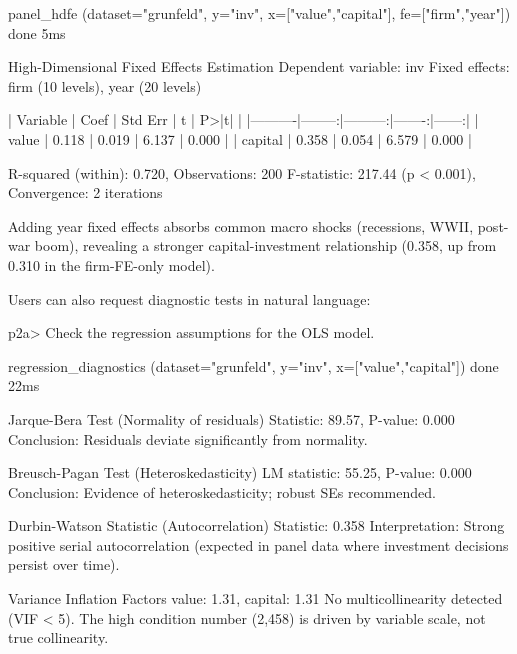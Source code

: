 \begin{Soutput}
  [tool] panel_hdfe (dataset="grunfeld", y="inv",
           x=["value","capital"], fe=["firm","year"])          done 5ms

High-Dimensional Fixed Effects Estimation
Dependent variable: inv
Fixed effects: firm (10 levels), year (20 levels)

| Variable |    Coef |  Std Err |      t | P>|t| |
|----------|--------:|---------:|-------:|------:|
| value    |   0.118 |    0.019 |  6.137 | 0.000 |
| capital  |   0.358 |    0.054 |  6.579 | 0.000 |

R-squared (within): 0.720,  Observations: 200
F-statistic: 217.44 (p < 0.001),  Convergence: 2 iterations

Adding year fixed effects absorbs common macro shocks (recessions, WWII,
post-war boom), revealing a stronger capital-investment relationship
(0.358, up from 0.310 in the firm-FE-only model).
\end{Soutput}

Users can also request diagnostic tests in natural language:

\begin{Sinput}
p2a> Check the regression assumptions for the OLS model.
\end{Sinput}

\begin{Soutput}
  [tool] regression_diagnostics (dataset="grunfeld", y="inv",
           x=["value","capital"])                              done 22ms

Jarque-Bera Test (Normality of residuals)
Statistic: 89.57,  P-value: 0.000
Conclusion: Residuals deviate significantly from normality.

Breusch-Pagan Test (Heteroskedasticity)
LM statistic: 55.25,  P-value: 0.000
Conclusion: Evidence of heteroskedasticity; robust SEs recommended.

Durbin-Watson Statistic (Autocorrelation)
Statistic: 0.358
Interpretation: Strong positive serial autocorrelation (expected in
panel data where investment decisions persist over time).

Variance Inflation Factors
value: 1.31,  capital: 1.31
No multicollinearity detected (VIF < 5).
The high condition number (2,458) is driven by variable scale, not
true collinearity.
\end{Soutput}



